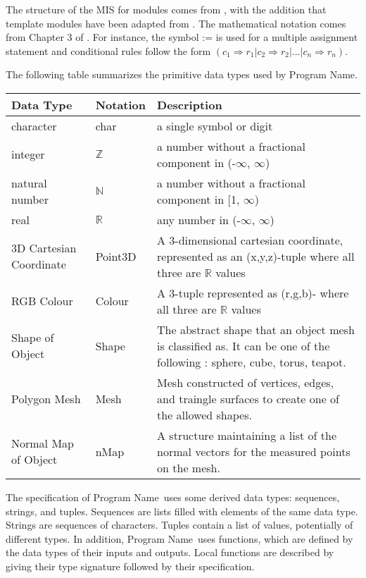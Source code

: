 \documentclass[12pt, titlepage]{article}
\newcommand{\progname}{Program Name}
\begin{document}

The structure of the MIS for modules comes from \citet{HoffmanAndStrooper1995},
with the addition that template modules have been adapted from
\cite{GhezziEtAl2003}.  The mathematical notation comes from Chapter 3 of
\citet{HoffmanAndStrooper1995}.  For instance, the symbol := is used for a
multiple assignment statement and conditional rules follow the form $(c_1
\Rightarrow r_1 | c_2 \Rightarrow r_2 | ... | c_n \Rightarrow r_n )$.

The following table summarizes the primitive data types used by \progname. 

\begin{center}
\renewcommand{\arraystretch}{1.2}
\noindent 
\begin{tabular}{l l p{7.5cm}} 
\toprule 
\textbf{Data Type} & \textbf{Notation} & \textbf{Description}\\ 
\midrule
character & char & a single symbol or digit\\
integer & $\mathbb{Z}$ & a number without a fractional component in (-$\infty$, $\infty$) \\
natural number & $\mathbb{N}$ & a number without a fractional component in [1, $\infty$) \\
real & $\mathbb{R}$ & any number in (-$\infty$, $\infty$)\\
3D Cartesian Coordinate & Point3D &  A 3-dimensional cartesian coordinate, 
represented as an (x,y,z)-tuple where all three are $\mathbb{R}$ values\\
RGB Colour & Colour &  A 3-tuple represented as (r,g,b)- where all three are 
$\mathbb{R}$ values\\
Shape of Object & Shape & The abstract shape that an object mesh is classified 
as. It can be one of the following : sphere, cube, torus, teapot. \\
Polygon Mesh & Mesh & Mesh constructed of vertices, edges, and traingle 
surfaces to create one of the allowed shapes.\\
Normal Map of Object & nMap & A structure maintaining a list of the normal 
vectors for the measured points on the mesh. \\
\bottomrule
\end{tabular} 
\end{center}

\noindent
The specification of \progname \ uses some derived data types: sequences, strings, and
tuples. Sequences are lists filled with elements of the same data type. Strings
are sequences of characters. Tuples contain a list of values, potentially of
different types. In addition, \progname \ uses functions, which
are defined by the data types of their inputs and outputs. Local functions are
described by giving their type signature followed by their specification.
\end{document}
